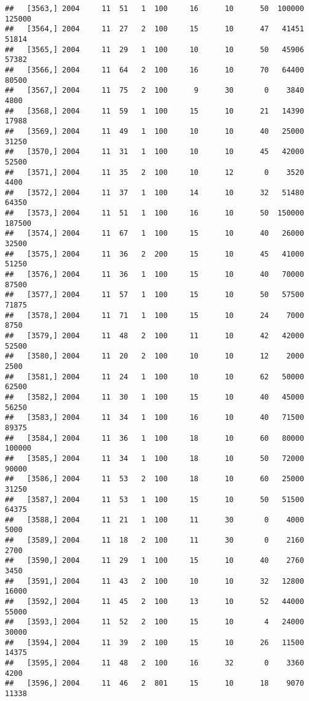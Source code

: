\documentclass{article}\usepackage[]{graphicx}\usepackage[]{color}
\makeatletter
\newenvironment{kframe}{%
 \def\at@end@of@kframe{}%
 \ifinner\ifhmode%
  \def\at@end@of@kframe{\end{minipage}}%
  \begin{minipage}{\columnwidth}%
 \fi\fi%
 \def\FrameCommand##1{\hskip\@totalleftmargin \hskip-\fboxsep
 \colorbox{shadecolor}{##1}\hskip-\fboxsep
     \hskip-\linewidth \hskip-\@totalleftmargin \hskip\columnwidth}%
 \MakeFramed {\advance\hsize-\width
   \@totalleftmargin\z@ \linewidth\hsize
   \@setminipage}}%
 {\par\unskip\endMakeFramed%
 \at@end@of@kframe}
\newenvironment{knitrout}{}{} %
\makeatother
\begin{document}
\begin{knitrout}
\begin{kframe}
\begin{verbatim}
##   [3563,] 2004     11  51   1  100     16      10      50  100000  125000
##   [3564,] 2004     11  27   2  100     15      10      47   41451   51814
##   [3565,] 2004     11  29   1  100     10      10      50   45906   57382
##   [3566,] 2004     11  64   2  100     16      10      70   64400   80500
##   [3567,] 2004     11  75   2  100      9      30       0    3840    4800
##   [3568,] 2004     11  59   1  100     15      10      21   14390   17988
##   [3569,] 2004     11  49   1  100     10      10      40   25000   31250
##   [3570,] 2004     11  31   1  100     10      10      45   42000   52500
##   [3571,] 2004     11  35   2  100     10      12       0    3520    4400
##   [3572,] 2004     11  37   1  100     14      10      32   51480   64350
##   [3573,] 2004     11  51   1  100     16      10      50  150000  187500
##   [3574,] 2004     11  67   1  100     15      10      40   26000   32500
##   [3575,] 2004     11  36   2  200     15      10      45   41000   51250
##   [3576,] 2004     11  36   1  100     15      10      40   70000   87500
##   [3577,] 2004     11  57   1  100     15      10      50   57500   71875
##   [3578,] 2004     11  71   1  100     15      10      24    7000    8750
##   [3579,] 2004     11  48   2  100     11      10      42   42000   52500
##   [3580,] 2004     11  20   2  100     10      10      12    2000    2500
##   [3581,] 2004     11  24   1  100     10      10      62   50000   62500
##   [3582,] 2004     11  30   1  100     15      10      40   45000   56250
##   [3583,] 2004     11  34   1  100     16      10      40   71500   89375
##   [3584,] 2004     11  36   1  100     18      10      60   80000  100000
##   [3585,] 2004     11  34   1  100     18      10      50   72000   90000
##   [3586,] 2004     11  53   2  100     18      10      60   25000   31250
##   [3587,] 2004     11  53   1  100     15      10      50   51500   64375
##   [3588,] 2004     11  21   1  100     11      30       0    4000    5000
##   [3589,] 2004     11  18   2  100     11      30       0    2160    2700
##   [3590,] 2004     11  29   1  100     15      10      40    2760    3450
##   [3591,] 2004     11  43   2  100     10      10      32   12800   16000
##   [3592,] 2004     11  45   2  100     13      10      52   44000   55000
##   [3593,] 2004     11  52   2  100     15      10       4   24000   30000
##   [3594,] 2004     11  39   2  100     15      10      26   11500   14375
##   [3595,] 2004     11  48   2  100     16      32       0    3360    4200
##   [3596,] 2004     11  46   2  801     15      10      18    9070   11338

\end{verbatim}
\end{kframe}
\end{knitrout}
\end{document}
